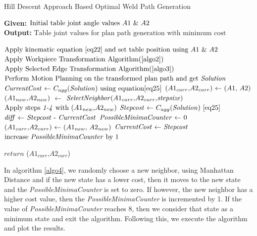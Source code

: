\begin{algorithm}
	\caption{Hill Descent Approach Based Optimal Weld Path Generation}
	\label{algo4}
	\textbf{Given:} $ \text{Initial table joint angle values \textit{$A1$} \& \textit{$A2$}}$ \\ 
	\textbf{Output:} $ \text{Table joint values for plan path generation with minimum cost}$ \\
	
	\begin{algorithmic}[1]
		\State $\text{Apply kinematic equation \ref{eq22} and set table position using \textit{$A1$} \& \textit{$A2$}}$
		\State $\text{Apply Workpiece Transformation Algorithm(\ref{algo2})}$
		\State $\text{Apply Selected Edge Transformation Algorithm(\ref{algo3})}$
		\State $\text{Perform Motion Planning on the transformed plan path and get \textit{Solution}}$
		\State $\text{\textit{CurrentCost} $\gets$ $C_{agg}$(\textit{Solution}) using equation\ref{eq25}}$
		\State $\text{(\textit{$A1_{curr}$},\textit{$A2_{curr}$}) $\gets$ (\textit{$A1$}, \textit{$A2$})}$
		\Do
		\State $\text{(\textit{$A1_{new}$},\textit{$A2_{new}$})}$ $\gets$ $\text{\textit{SelectNeighbor}(\textit{$A1_{curr}$},\textit{$A2_{curr}$},\textit{stepsize})}$
		\State $\text{Apply steps \textit{1-4} with (\textit{$A1_{new}$},\textit{$A2_{new}$})}$
		\State $\text{\textit{Stepcost} $\gets$ $C_{agg}$(\textit{Solution}) \ref{eq25}}$
		\State $\text{\textit{diff} $\gets$ \textit{Stepcost} - \textit{CurrentCost}}$
		\If {[${diff < 0}$]}
		\State $\text{\textit{PossibleMinimaCounter} $\gets$ 0}$
		\State $\text{(\textit{$A1_{curr}$},\textit{$A2_{curr}$}) $\gets$ (\textit{$A1_{new}$}, \textit{$A2_{new}$})}$
		\State $\text{\textit{CurrentCost} $\gets$ \textit{Stepcost}}$
		\Else
		\State $\text{increase \textit{PossibleMinimaCounter} by 1}$
		\EndIf  
		
		\State $\textit{return}$ ($\textit{$A1_{curr}$}$,$\textit{$A2_{curr}$}$)     
	\end{algorithmic}
\end{algorithm}
In algorithm \ref{algo4}, we randomly choose a new neighbor, using Manhattan Distance and if the new state has a lower cost, then it moves to the new state and the \textit{PossibleMinimaCounter} is set to zero. If however, the new neighbor has a higher cost value, then the \textit{PossibleMinimaCounter} is incremented by 1. If the value of \textit{PossibleMinimaCounter} reaches 8, then we consider that state as a minimum state and exit the algorithm. Following this, we execute the algorithm and plot the results.
